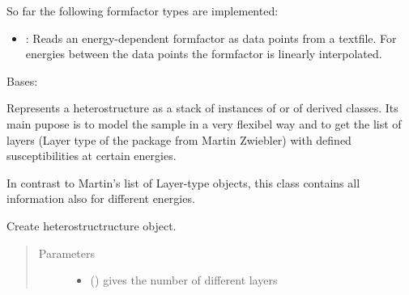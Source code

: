 \documentclass[letterpaper,10pt,english]{sphinxmanual}
\begin{document}
So far the following formfactor types are implemented:
\begin{itemize}
\item {} 
{\hyperref[\detokenize{modules-api/samplerepresentation:SampleRepresentation.FFfromFile}]{}}: Reads an energy-dependent formfactor as data points from a textfile. For energies between the data points the formfactor is linearly interpolated.

\end{itemize}

\begin{fulllineitems}
\label{\detokenize{modules-api/samplerepresentation:SampleRepresentation.Heterostructure}}
Bases: 

Represents a heterostructure as a stack of instances of {\hyperref[\detokenize{modules-api/samplerepresentation:SampleRepresentation.LayerObject}]{}} or of derived classes.
Its main pupose is to model the sample in a very flexibel way and to get the list of layers (Layer type of the  package from Martin Zwiebler) with defined susceptibilities at certain energies.

In contrast to Martin’s list of Layer-type objects, this class contains all information also for different energies.

\begin{fulllineitems}
\label{\detokenize{modules-api/samplerepresentation:SampleRepresentation.Heterostructure.__init__}}
Create heterostructructure object.
\begin{quote}\begin{description}
\item[{Parameters}] \leavevmode\begin{itemize}
\item {} 
 () \textendash{} gives the number of different layers


\end{itemize}
\end{description}
\end{quote}
\end{fulllineitems}
\end{fulllineitems}
\end{document}
